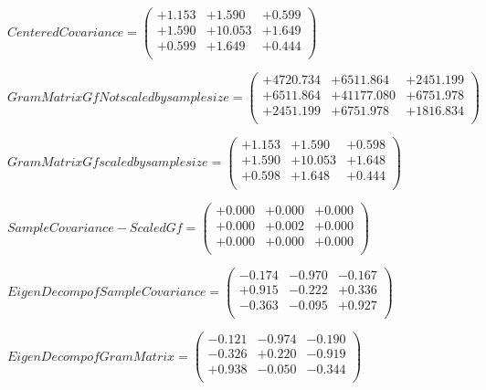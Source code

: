 \documentclass[9pt]{article}
\theoremstyle{plain}
\theoremstyle{definition}
\theoremstyle{remark}
\numberwithin{equation}{section}
\begin{document}
$Centered Covariance = \left(
\begin{array}{
ccc}
+1.153 & +1.590 & +0.599 \\
+1.590 & +10.053 & +1.649 \\
+0.599 & +1.649 & +0.444 \\
\end{array}
\right)$ \newline 

$Gram Matrix Gf Not scaled by sample size = \left(
\begin{array}{
ccc}
+4720.734 & +6511.864 & +2451.199 \\
+6511.864 & +41177.080 & +6751.978 \\
+2451.199 & +6751.978 & +1816.834 \\
\end{array}
\right)$ \newline 

$Gram Matrix Gf  scaled by sample size = \left(
\begin{array}{
ccc}
+1.153 & +1.590 & +0.598 \\
+1.590 & +10.053 & +1.648 \\
+0.598 & +1.648 & +0.444 \\
\end{array}
\right)$ \newline 

$SampleCovariance - Scaled Gf = \left(
\begin{array}{
ccc}
+0.000 & +0.000 & +0.000 \\
+0.000 & +0.002 & +0.000 \\
+0.000 & +0.000 & +0.000 \\
\end{array}
\right)$ \newline 

$EigenDecomp of SampleCovariance = \left(
\begin{array}{
ccc}
-0.174 & -0.970 & -0.167 \\
+0.915 & -0.222 & +0.336 \\
-0.363 & -0.095 & +0.927 \\
\end{array}
\right)$ \newline 

$EigenDecomp of Gram Matrix = \left(
\begin{array}{
ccc}
-0.121 & -0.974 & -0.190 \\
-0.326 & +0.220 & -0.919 \\
+0.938 & -0.050 & -0.344 \\
\end{array}
\right)$ \newline 
\end{document}
